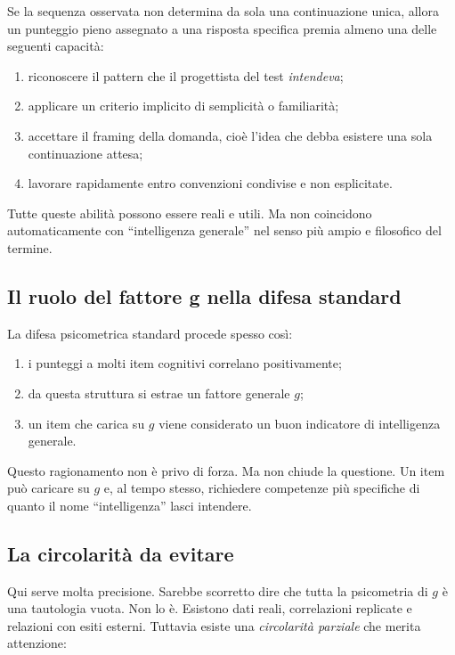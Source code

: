 \documentclass[10pt, a4paper]{article}
\theoremstyle{plain}
\theoremstyle{definition}
\theoremstyle{remark}
\begin{document}
Se la sequenza osservata non determina da sola una continuazione unica, allora
un punteggio pieno assegnato a una risposta specifica premia almeno una delle
seguenti capacità:
\begin{enumerate}[label=\arabic*.]
    \item riconoscere il pattern che il progettista del test \emph{intendeva};
    \item applicare un criterio implicito di semplicità o familiarità;
    \item accettare il framing della domanda, cioè l'idea che debba esistere una
          sola continuazione attesa;
    \item lavorare rapidamente entro convenzioni condivise e non esplicitate.
\end{enumerate}

Tutte queste abilità possono essere reali e utili. Ma non coincidono
automaticamente con ``intelligenza generale'' nel senso più ampio e filosofico
del termine.

\subsection{Il ruolo del fattore g nella difesa standard}

La difesa psicometrica standard procede spesso così:
\begin{enumerate}[label=\arabic*.]
    \item i punteggi a molti item cognitivi correlano positivamente;
    \item da questa struttura si estrae un fattore generale $g$;
    \item un item che carica su $g$ viene considerato un buon indicatore di
          intelligenza generale.
\end{enumerate}

Questo ragionamento non è privo di forza. Ma non chiude la questione. Un item
può caricare su $g$ e, al tempo stesso, richiedere competenze più specifiche di
quanto il nome ``intelligenza'' lasci intendere.

\subsection{La circolarità da evitare}

Qui serve molta precisione. Sarebbe scorretto dire che tutta la psicometria di
$g$ è una tautologia vuota. Non lo è. Esistono dati reali, correlazioni
replicate e relazioni con esiti esterni. Tuttavia esiste una \emph{circolarità
parziale} che merita attenzione:
\end{document}
